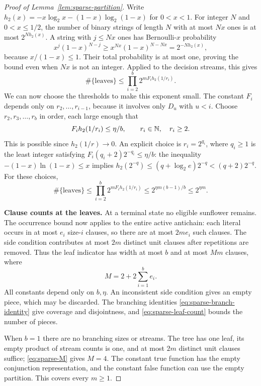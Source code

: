 \begin{proof}[Proof of Lemma~\ref{lem:sparse-partition}]
Write $h_2(x)=-x\log_2x-(1-x)\log_2(1-x)$ for $0<x<1$.
For integer $N$ and $0<x\le1/2$, the number of binary strings of length
$N$ with at most $Nx$ ones is at most $2^{Nh_2(x)}$.  A string with
$j\le Nx$ ones has Bernoulli-$x$ probability
\[
 x^j(1-x)^{N-j}\ge x^{Nx}(1-x)^{N-Nx}=2^{-Nh_2(x)},
\]
because $x/(1-x)\le1$.  Their total probability is at most one, proving
the bound even when $Nx$ is not an integer.  Applied to the decision
streams, this gives
\[
 \#\{\text{leaves}\}\le
 \prod_{i=2}^{b}2^{mF_i h_2(1/r_i)}.
\]
We can now choose the thresholds to make this exponent small.  The
constant $F_i$ depends only on $r_2,\ldots,r_{i-1}$, because it involves
only $D_u$ with $u<i$.  Choose $r_2,r_3,\ldots,r_b$ in order, each large
enough that
\begin{equation}\label{eq:sparse-thresholds}
 F_i h_2(1/r_i)\le\eta/b,\qquad r_i\in\mathbb N,\quad r_i\ge2.
\end{equation}
This is possible since $h_2(1/r)\to0$.  An explicit choice is
$r_i=2^{q_i}$, where $q_i\ge1$ is the least integer satisfying
$F_i(q_i+2)2^{-q_i}\le\eta/b$: the inequality
$-(1-x)\ln(1-x)\le x$ implies
$h_2(2^{-q})\le(q+\log_2e)2^{-q}<(q+2)2^{-q}$.
For these choices,
\begin{equation}\label{eq:sparse-leaf-count}
 \#\{\text{leaves}\}\le
 \prod_{i=2}^{b}2^{mF_i h_2(1/r_i)}
 \le2^{\eta m(b-1)/b}\le2^{\eta m}.
\end{equation}

\medskip\noindent
\textbf{Clause counts at the leaves.}
At a terminal state no eligible sunflower remains.  The occurrence
bound now applies to the entire active antichain: each literal occurs
in at most $e_i$ size-$i$ clauses, so there are at most $2me_i$ such
clauses.  The side condition contributes at most $2m$ distinct unit
clauses after repetitions are removed.  Thus the leaf indicator has
width at most $b$ and at most $Mm$ clauses, where
\begin{equation}\label{eq:sparse-M}
 M=2+2\sum_{i=1}^{b}e_i.
\end{equation}
All constants depend only on $b,\eta$.  An inconsistent side condition
gives an empty piece, which may be discarded.  The branching identities
\eqref{eq:sparse-branch-identity} give coverage and disjointness, and
\eqref{eq:sparse-leaf-count} bounds the number of pieces.

When $b=1$ there are no branching sizes or streams.  The tree has one
leaf, its empty product of stream counts is one, and at most $2m$
distinct unit clauses suffice; \eqref{eq:sparse-M} gives $M=4$.
The constant true function has the empty conjunction representation,
and the constant false function can use the empty partition.  This
covers every $m\ge1$.
\end{proof}
